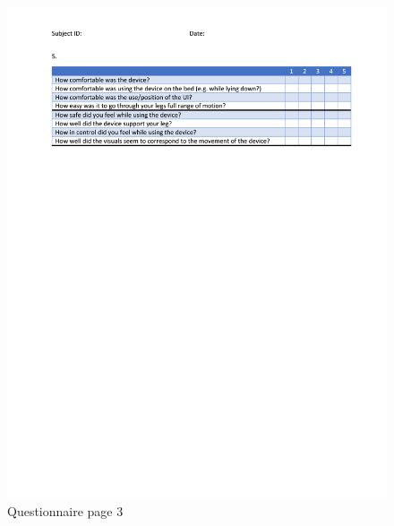 \documentclass[12pt]{report}
\begin{document}
\begin{figure}[p] 
	\centering
	\includegraphics[width=\linewidth]{questionnaire_p3}
	\caption{Questionnaire page 3}
	\label{fig:q_p3}
\end{figure}



	
\end{document}
